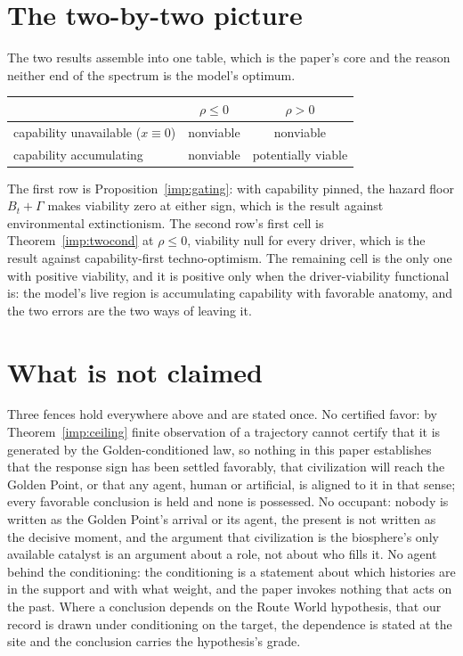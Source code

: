 \section{The two-by-two picture}\label{sec:table}

The two results assemble into one table, which is the paper's core and
the reason neither end of the spectrum is the model's optimum.
\begin{center}
\begin{tabular}{@{}l|cc@{}}
\toprule
 & $\rho\le0$ & $\rho>0$\\
\midrule
capability unavailable ($x\equiv0$) & nonviable & nonviable\\
capability accumulating & nonviable & potentially viable\\
\bottomrule
\end{tabular}
\end{center}
The first row is Proposition~\ref{imp:gating}: with capability pinned,
the hazard floor $B_t+\Gamma$ makes viability zero at either sign, which
is the result against environmental extinctionism. The second row's
first cell is Theorem~\ref{imp:twocond} at $\rho\le0$, viability null
for every driver, which is the result against capability-first
techno-optimism. The remaining cell is the only one with positive
viability, and it is positive only when the driver-viability functional
is: the model's live region is accumulating capability with favorable
anatomy, and the two errors are the two ways of leaving it.

\section{What is not claimed}\label{sec:fences}

Three fences hold everywhere above and are stated once. No certified
favor: by Theorem~\ref{imp:ceiling} finite observation of a trajectory
cannot certify that it is generated by the Golden-conditioned law, so
nothing in this paper establishes that the response sign has been
settled favorably, that civilization will reach the Golden Point, or
that any agent, human or artificial, is aligned to it in that sense;
every favorable conclusion is held and none is possessed.
No occupant: nobody is written as the Golden Point's arrival or its
agent, the present is not written as the decisive moment, and the
argument that civilization is the biosphere's only available catalyst
is an argument about a role, not about who fills it. No agent behind
the conditioning: the conditioning is a statement about which histories
are in the support and with what weight, and the paper invokes nothing
that acts on the past. Where a conclusion depends on the Route World
hypothesis, that our record is drawn under conditioning on the target,
the dependence is stated at the site and the conclusion carries the
hypothesis's grade.

